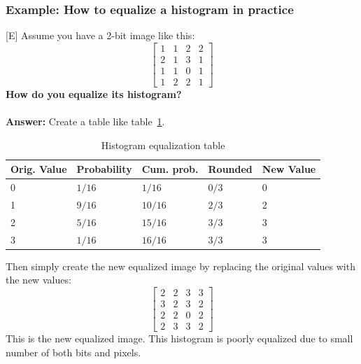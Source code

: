 \documentclass[12pt]{article}
\begin{document}
	\subsubsection{Example: How to equalize a histogram in practice}
	[E] Assume you have a 2-bit image like this:
	\begin{equation}		
	\begin{bmatrix}
		1 & 1 & 2 & 2 \\
		2 & 1 & 3 & 1 \\
		1 & 1 & 0 & 1 \\
		1 & 2 & 2 & 1
	\end{bmatrix}
	\end{equation}
	\textbf{How do you equalize its histogram?}\\
	\\
	\textbf{Answer:} Create a table like table~\ref{tab:histeq}.
	\begin{table}[h!]
	\centering
	\begin{tabular}{lllll}
		\rowcolor[HTML]{EFEFEF} 
		Orig. Value & \multicolumn{1}{c}{\cellcolor[HTML]{EFEFEF}Probability} & Cum. prob. & Rounded & New Value \\ \hline
		0     		& $1/16$                                          		  & $1/16$     & $0/3$   & 0         \\ \hline
		1     		& $9/16$                                          		  & $10/16$    & $2/3$   & 2         \\ \hline
		2     		& $5/16$                                          		  & $15/16$    & $3/3$   & 3         \\ \hline
		3     		& $1/16$                                         		  & $16/16$    & $3/3$   & 3         \\ \hline
	\end{tabular}
	\caption{Histogram equalization table}
	\label{tab:histeq}
	\end{table}
	Then simply create the new equalized image by replacing the original values with the new values:
	\begin{equation}		
	\begin{bmatrix}
		2 & 2 & 3 & 3 \\
		3 & 2 & 3 & 2 \\
		2 & 2 & 0 & 2 \\
		2 & 3 & 3 & 2
	\end{bmatrix}
	\end{equation}
	This is the new equalized image. This histogram is poorly equalized due to small number of both
	bits and pixels.
\end{document}
